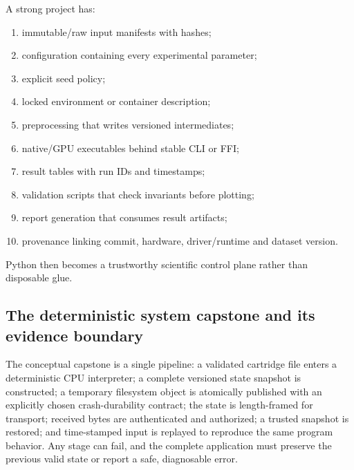 \hypertarget{01-foundations-i-ch017-a-reproducible-graphics-research-stack}{}

A strong project has:

\begin{enumerate}
\def\labelenumi{\arabic{enumi}.}
\tightlist
\item
  immutable/raw input manifests with hashes;
\item
  configuration containing every experimental parameter;
\item
  explicit seed policy;
\item
  locked environment or container description;
\item
  preprocessing that writes versioned intermediates;
\item
  native/GPU executables behind stable CLI or FFI;
\item
  result tables with run IDs and timestamps;
\item
  validation scripts that check invariants before plotting;
\item
  report generation that consumes result artifacts;
\item
  provenance linking commit, hardware, driver/runtime and dataset version.
\end{enumerate}

Python then becomes a trustworthy scientific control plane rather than disposable glue.

\subsection{The deterministic system capstone and its evidence boundary}\label{01-foundations-i-ch017-the-deterministic-system-capstone-and-its-evidence-boundary}

\hypertarget{01-foundations-i-ch017-the-deterministic-system-capstone-and-its-evidence-boundary}{}

The conceptual capstone is a single pipeline: a validated cartridge file enters a deterministic CPU interpreter; a complete versioned state snapshot is constructed; a temporary filesystem object is atomically published with an explicitly chosen crash-durability contract; the state is length-framed for transport; received bytes are authenticated and authorized; a trusted snapshot is restored; and time-stamped input is replayed to reproduce the same program behavior. Any stage can fail, and the complete application must preserve the previous valid state or report a safe, diagnosable error.

